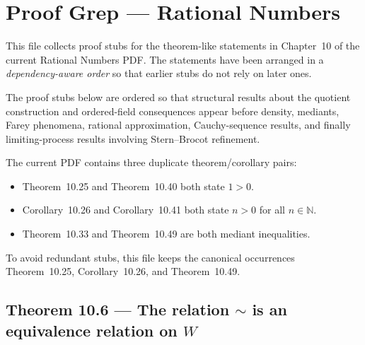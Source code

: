 
\section*{Proof Grep — Rational Numbers}

This file collects proof stubs for the theorem-like statements in Chapter~10
of the current Rational Numbers PDF.  The statements have been arranged in a
\emph{dependency-aware order} so that earlier stubs do not rely on later ones.

\begin{remark*}
The proof stubs below are ordered so that structural results about the quotient
construction and ordered-field consequences appear before density, mediants,
Farey phenomena, rational approximation, Cauchy-sequence results, and finally
limiting-process results involving Stern--Brocot refinement.
\end{remark*}

\begin{remark*}
The current PDF contains three duplicate theorem/corollary pairs:
\begin{itemize}
  \item Theorem~10.25 and Theorem~10.40 both state $1 > 0$.
  \item Corollary~10.26 and Corollary~10.41 both state $n > 0$ for all $n \in \mathbb{N}$.
  \item Theorem~10.33 and Theorem~10.49 are both mediant inequalities.
\end{itemize}
To avoid redundant stubs, this file keeps the canonical occurrences
Theorem~10.25, Corollary~10.26, and Theorem~10.49.
\end{remark*}

\subsection*{Theorem 10.6 — The relation $\sim$ is an equivalence relation on $W$}
\label{prf:grep-rational-equivalence-relation}

